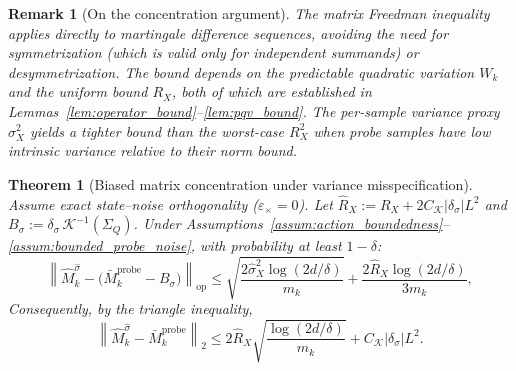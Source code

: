 \documentclass[12pt]{article}
\newcommand{\op}{\mathrm{op}}
\newtheorem{theorem}{Theorem}
\newtheorem{remark}{Remark}
\theoremstyle{plain}
\theoremstyle{definition}
\begin{document}
\begin{remark}[On the concentration argument]
The matrix Freedman inequality applies directly to martingale difference sequences, avoiding the need for symmetrization (which is valid only for independent summands) or desymmetrization. The bound depends on the predictable quadratic variation $W_k$ and the uniform bound $R_X$, both of which are established in Lemmas~\ref{lem:operator_bound}--\ref{lem:pqv_bound}. The per-sample variance proxy $\sigma_X^2$ yields a tighter bound than the worst-case $R_X^2$ when probe samples have low intrinsic variance relative to their norm bound.
\end{remark}

\begin{theorem}[Biased matrix concentration under variance misspecification]
\label{thm:biased_concentration}
Assume exact state--noise orthogonality ($\varepsilon_\times = 0$). Let $\hat{R}_X := R_X + 2C_{\mathcal{K}} |\delta_\sigma| L^2$ and $B_\sigma := \delta_\sigma\, \mathcal{K}^{-1}(\Sigma_Q)$. Under Assumptions~\ref{assum:action_boundedness}--\ref{assum:bounded_probe_noise}, with probability at least $1 - \delta$:
\begin{equation}
\left\|\widehat{M}_k^{\hat\sigma} - \bigl(\bar{M}_k^{\mathrm{probe}} - B_\sigma\bigr)\right\|_{\op}
\le \sqrt{\frac{2\hat\sigma_X^2 \log(2d/\delta)}{m_k}} + \frac{2\hat{R}_X \log(2d/\delta)}{3m_k},
\label{eq:biased_conc}
\end{equation}
Consequently, by the triangle inequality,
\begin{equation}
\left\|\widehat{M}_k^{\hat\sigma} - \bar{M}_k^{\mathrm{probe}}\right\|_2
\le 2\hat{R}_X \sqrt{\frac{\log(2d/\delta)}{m_k}} + C_{\mathcal{K}} |\delta_\sigma| L^2.
\label{eq:biased_conc_coarse}
\end{equation}
\end{theorem}
\end{document}

